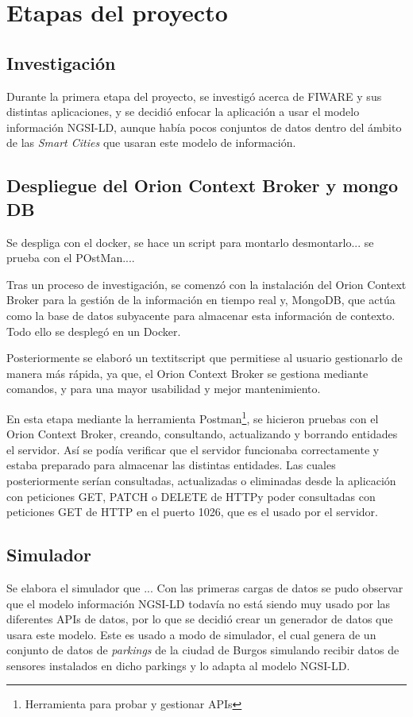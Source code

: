 
\section{Etapas del proyecto}\label{etapas-del-proyecto}


\subsection{Investigación}
Durante la primera etapa del proyecto, se investigó acerca de FIWARE y sus distintas aplicaciones, y se decidió enfocar la aplicación a usar el modelo información NGSI-LD, aunque había pocos conjuntos de datos dentro del ámbito de las \textit{Smart Cities} que usaran este modelo de información. 

\subsection{Despliegue del Orion Context Broker y mongo DB}
Se despliga con el docker, se hace un script para montarlo desmontarlo... se prueba con el POstMan....

Tras un proceso de investigación, se comenzó con la instalación del Orion Context Broker para la gestión de la información en tiempo real y, MongoDB, que actúa como la base de datos subyacente para almacenar esta información de contexto. Todo ello se desplegó en un Docker.


Posteriormente se elaboró un textit{script} que permitiese al usuario gestionarlo de manera más rápida, ya que, el Orion Context Broker se gestiona mediante comandos, y para una mayor usabilidad y mejor mantenimiento. 



En esta etapa mediante la herramienta Postman\footnote{Herramienta para probar y gestionar APIs}, se hicieron pruebas con el Orion Context Broker, creando, consultando, actualizando y borrando entidades el servidor. Así se podía verificar que el servidor funcionaba correctamente y estaba preparado para almacenar las distintas entidades.
Las cuales posteriormente serían consultadas, actualizadas o eliminadas desde la aplicación con peticiones GET, PATCH o DELETE de HTTPy poder consultadas con peticiones GET de HTTP en el puerto 1026, que es el usado por el servidor.


\subsection{Simulador}
Se elabora el simulador que ...
Con las primeras cargas de datos se pudo observar que el modelo información NGSI-LD todavía no está siendo muy usado por las diferentes APIs de datos, por lo que se decidió crear un generador de datos que usara este modelo. Este es usado a modo de simulador, el cual genera de un conjunto de datos de \textit{parkings} de la ciudad de Burgos simulando recibir datos de sensores instalados en dicho parkings y lo adapta al modelo NGSI-LD. 

